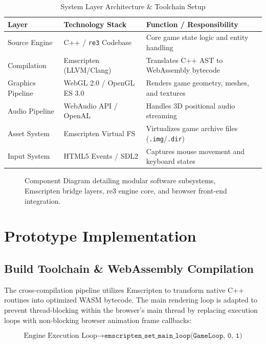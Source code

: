 \documentclass[12pt,a4paper]{article}
\begin{document}
\begin{table}[H]
\centering
\caption{System Layer Architecture \& Toolchain Setup}
\label{tab:specifications}
\begin{tabularx}{\textwidth}{l l X}
\toprule
\textbf{Layer} & \textbf{Technology Stack} & \textbf{Function / Responsibility} \\
\midrule
Source Engine      & C++ / \texttt{re3} Codebase      & Core game state logic and entity handling \\
Compilation        & Emscripten (LLVM/Clang)  & Translates C++ AST to WebAssembly bytecode \\
Graphics Pipeline  & WebGL 2.0 / OpenGL ES 3.0 & Renders game geometry, meshes, and textures \\
Audio Pipeline     & WebAudio API / OpenAL    & Handles 3D positional audio streaming \\
Asset System       & Emscripten Virtual FS    & Virtualizes game archive files (\texttt{.img}/\texttt{.dir}) \\
Input System       & HTML5 Events / SDL2      & Captures mouse movement and keyboard states \\
\bottomrule
\end{tabularx}
\end{table}

\begin{figure}[H]
    \centering
    
    \caption{Component Diagram detailing modular software subsystems, Emscripten bridge layers, re3 engine core, and browser front-end integration.}
    \label{fig:component}
\end{figure}

\section{Prototype Implementation}

\subsection{Build Toolchain \& WebAssembly Compilation}
The cross-compilation pipeline utilizes Emscripten to transform native C++ routines into optimized WASM bytecode. The main rendering loop is adapted to prevent thread-blocking within the browser's main thread by replacing execution loops with non-blocking browser animation frame callbacks:

$$\text{Engine Execution Loop} \longrightarrow \texttt{emscripten\_set\_main\_loop(GameLoop, 0, 1)}$$
\end{document}
